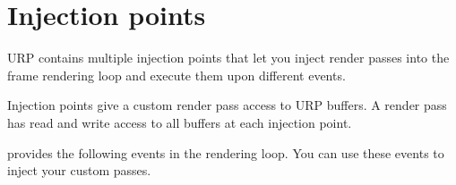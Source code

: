 \chapter{Injection points}
\hypertarget{md__hey_tea_9_2_library_2_package_cache_2com_8unity_8render-pipelines_8universal_0d14_80_88_2_do699d50b816663a219dd395b1fd4c40ff}{}\label{md__hey_tea_9_2_library_2_package_cache_2com_8unity_8render-pipelines_8universal_0d14_80_88_2_do699d50b816663a219dd395b1fd4c40ff}
\label{md__hey_tea_9_2_library_2_package_cache_2com_8unity_8render-pipelines_8universal_0d14_80_88_2_do699d50b816663a219dd395b1fd4c40ff_autotoc_md2105}%
%
 URP contains multiple injection points that let you inject render passes into the frame rendering loop and execute them upon different events.

Injection points give a custom render pass access to URP buffers. A render pass has read and write access to all buffers at each injection point.

 provides the following events in the rendering loop. You can use these events to inject your custom passes.

